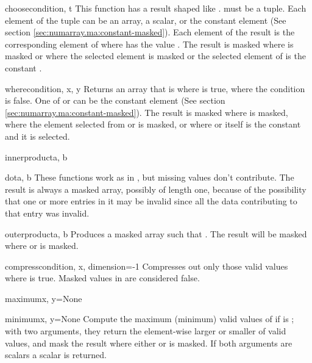 \begin{funcdesc}{choose}{condition, t}
   This function has a result shaped like .  must be a
   tuple. Each element of the tuple can be an array, a scalar, or the constant
   element  (See section \ref{sec:numarray.ma:constant-masked}). Each
   element of the result is the corresponding element of  where
    has the value . The result is masked where
    is masked or where the selected element is masked or the
   selected element of  is the constant .
\end{funcdesc}

\begin{funcdesc}{where}{condition, x, y}
   Returns an array that is  where  is true,
    where the condition is false. One of  or  can
   be the constant element  (See section
   \ref{sec:numarray.ma:constant-masked}). The result is masked where  is
   masked, where the element selected from  or  is masked, or
   where  or  itself is the constant  and it is
   selected.
\end{funcdesc}

\begin{funcdesc}{innerproduct}{a, b}
\end{funcdesc}
\begin{funcdesc}{dot}{a, b}
   These functions work as in \module{\numarray}, but missing values don't
   contribute. The result is always a masked array, possibly of length one,
   because of the possibility that one or more entries in it may be invalid
   since all the data contributing to that entry was invalid.
\end{funcdesc}

\begin{funcdesc}{outerproduct}{a, b}
   Produces a masked array such that . The
   result will be masked where  or  is masked.
\end{funcdesc}

\begin{funcdesc}{compress}{condition, x, dimension=-1}
   Compresses out only those valid values where  is true. Masked
   values in  are considered false.
\end{funcdesc}

\begin{funcdesc}{maximum}{x, y=None}
\end{funcdesc}
\begin{funcdesc}{minimum}{x, y=None}
   Compute the maximum (minimum) valid values of  if  is
   ; with two arguments, they return the element-wise larger or
   smaller of valid values, and mask the result where either  or 
   is masked.  If both arguments are scalars a scalar is returned.
\end{funcdesc}


